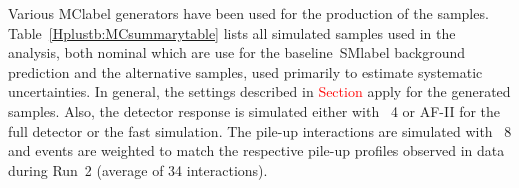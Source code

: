 Various \acrshort{MClabel} generators have been used for the production of the samples. Table~\ref{Hplustb:MCsummarytable} lists all simulated samples used in the analysis, both nominal which are use for the baseline~\acrshort{SMlabel} background prediction and the alternative samples, used primarily to estimate systematic uncertainties. In general, the settings described in \textcolor{red}{Section} apply for the generated samples. Also, the detector response is simulated either with \GEANT~4 or AF-II for the full detector or the fast simulation. The pile-up interactions are simulated with \PYTHIA~8 and events are weighted to match the respective pile-up profiles observed in data during Run~2 (average of 34 interactions).%

